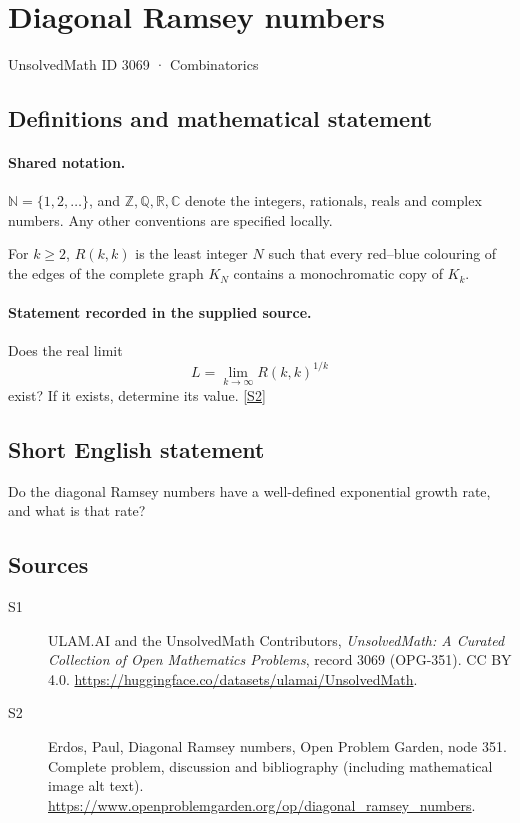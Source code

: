 \documentclass[11pt]{book}
\newcommand{\sref}[2]{\hyperlink{source:#1:#2}{[S#2]}}
\begin{document}
\setcounter{section}{3068}
\section{Diagonal Ramsey numbers}\label{3069}
{\small\sffamily UnsolvedMath ID 3069 · Combinatorics}
\subsection{Definitions and mathematical statement}

\paragraph{Shared notation.}$\mathbb N=\{1,2,\ldots\}$, and $\mathbb Z,\mathbb Q,\mathbb R,\mathbb C$ denote the integers, rationals, reals and complex numbers. Any other conventions are specified locally.


For $k\geq2$, $R(k,k)$ is the least integer $N$ such that every red--blue colouring of the edges of the complete graph $K_N$ contains a monochromatic copy of $K_k$.
\paragraph{Statement recorded in the supplied source.}
Does the real limit
\[L=\lim_{k\to\infty}R(k,k)^{1/k}\]
exist? If it exists, determine its value. \sref{3069}{2}
\subsection{Short English statement}
Do the diagonal Ramsey numbers have a well-defined exponential growth rate, and what is that rate?
\subsection{Sources}
\begin{description}
\item[\hypertarget{source:3069:1}{S1}] ULAM.AI and the UnsolvedMath Contributors, \emph{UnsolvedMath: A Curated Collection of Open Mathematics Problems}, record 3069 (OPG-351). CC BY 4.0. \url{https://huggingface.co/datasets/ulamai/UnsolvedMath}.
\item[\hypertarget{source:3069:2}{S2}] Erdos, Paul, Diagonal Ramsey numbers, Open Problem Garden, node 351. Complete problem, discussion and bibliography (including mathematical image alt text). \url{https://www.openproblemgarden.org/op/diagonal_ramsey_numbers}.
\end{description}
\label{end:3069}
\end{document}
